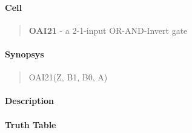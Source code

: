 \label{OAI21}
\paragraph{Cell}
\begin{quote}
    \textbf{OAI21} - a 2-1-input OR-AND-Invert gate
\end{quote}

\paragraph{Synopsys}
\begin{quote}
    OAI21(Z, B1, B0, A)
\end{quote}

\paragraph{Description}

%

\paragraph{Truth Table}


